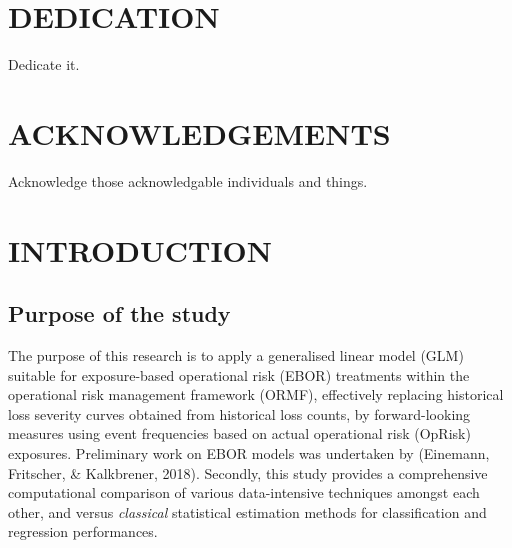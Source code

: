 \documentclass{DissertateUSU}
\begin{document}
\chapter*{DEDICATION}

Dedicate it.

\newpage
{}
\fancyhead[R]{\thepage}
\fancyfoot[C]{}
\chapter*{ACKNOWLEDGEMENTS}

Acknowledge those acknowledgable individuals and things.

\newpage
{}
\fancyhead[R]{\thepage}
\fancyfoot[C]{}
\tableofcontents

\newpage
{}
\fancyhead[R]{\thepage}
\fancyfoot[C]{}
\listoftables

\newpage
{}
\fancyhead[R]{\thepage}
\fancyfoot[C]{}
\listoffigures

\newpage
{}

\newpage
{}
\fancyhead[R]{\thepage}
\fancyfoot[C]{}

\chapter{INTRODUCTION}

\doublespacing

\section{Purpose of the study}
\label{sec:Purpose of the study}

The purpose of this research is to apply a generalised linear model
(GLM) suitable for exposure-based operational risk (EBOR) treatments
within the operational risk management framework (ORMF), effectively
replacing historical loss severity curves obtained from historical loss
counts, by forward-looking measures using event frequencies based on
actual operational risk (OpRisk) exposures. Preliminary work on EBOR
models was undertaken by (Einemann, Fritscher, \& Kalkbrener, 2018).
Secondly, this study provides a comprehensive computational comparison
of various data-intensive techniques amongst each other, and versus
\emph{classical} statistical estimation methods for classification and
regression performances.\medskip
\end{document}
